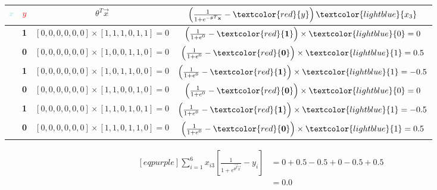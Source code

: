 \begin{table}[H]
	\centering
	\caption{}
	\label{tab:training-3}
	\begin{tabular}{*{4}{|c}|}
		\hline
		\textcolor{lightblue}{$x$} & \textcolor{red}{$y$} & $\theta^{T}\vec{x}$ & $\left( \frac{1}{1 + e^{-\vec{\theta}^{T}\vec{x}} } - \textcolor{red}{y} \right) \textcolor{lightblue}{x_{3}}$\\
		\hline
		[1, 1, 1, 0, 1, 1] & \textbf{1} & $[0, 0, 0, 0, 0, 0] \times [1, 1, 1, 0, 1, 1] = 0$ & $\left( \frac{1}{1 + e^{0}} - \textcolor{red}{\mathbf{1}} \right) \times \textcolor{lightblue}{0} = 0$\\
		\hline
		[1, 0, 0, 1, 1, 0] & \textbf{0} & $[0, 0, 0, 0, 0, 0] \times [1, 0, 0, 1, 1, 0] = 0$ & $\left( \frac{1}{1 + e^{0}} - \textcolor{red}{\mathbf{0}} \right) \times \textcolor{lightblue}{1} = 0.5$\\
		\hline
		[1, 0, 1, 1, 0, 0] & \textbf{1} & $[0, 0, 0, 0, 0, 0] \times [1, 0, 1, 1, 0, 0] = 0$ & $\left( \frac{1}{1 + e^{0}} - \textcolor{red}{\mathbf{1}} \right) \times \textcolor{lightblue}{1} = -0.5$\\
		\hline
		[1, 1, 0, 0, 1, 0] & \textbf{0} & $[0, 0, 0, 0, 0, 0] \times [1, 1, 0, 0, 1, 0] = 0$ & $\left( \frac{1}{1 + e^{0}} - \textcolor{red}{\mathbf{0}} \right) \times \textcolor{lightblue}{0} = 0$\\
		\hline
		[1, 1, 0, 1, 0, 1] & \textbf{1} & $[0, 0, 0, 0, 0, 0] \times [1, 1, 0, 1, 0, 1] = 0$ & $\left( \frac{1}{1 + e^{0}} - \textcolor{red}{\mathbf{1}} \right) \times \textcolor{lightblue}{1} = -0.5$\\
		\hline
		[1, 1, 0, 1, 1, 0] & \textbf{0} & $[0, 0, 0, 0, 0, 0] \times [1, 1, 0, 1, 1, 0] = 0$ & $\left( \frac{1}{1 + e^{0}} - \textcolor{red}{\mathbf{0}} \right) \times \textcolor{lightblue}{1} = 0.5$\\
		\hline
	\end{tabular}
\end{table}
\begin{equation*}
\begin{aligned}[eqpurple]
	\sum_{i=1}^6 x_{i3} \left[ \frac{1}{ 1 + e^{\vec{\theta^{T}}\vec{x}}} - y_{i} \right] &= 0 + 0.5 - 0.5 + 0 - 0.5 + 0.5 \\
&= 0.0
\end{aligned}
\end{equation*}
